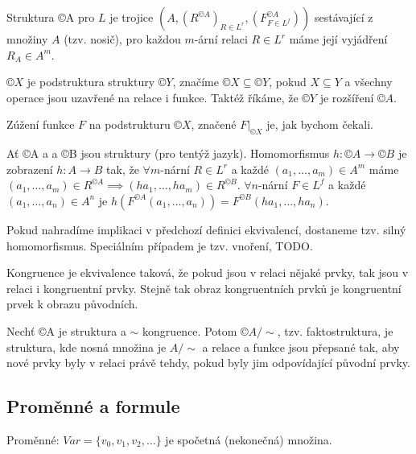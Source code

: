 \documentclass[12pt]{article}                   %
\begin{document}
    \begin{definice}[Struktura]
        Struktura ©A pro $L$ je trojice $(A, (R^{©A})_{R \in L^r}, (F^{©A}_{F \in L^f}))$ sestávající z množiny $A$ (tzv. nosič), pro každou $m$-ární relaci $R \in L^r$ máme její vyjádření $R_A \in A^m$.
    \end{definice}

    \begin{definice}
        $©X$ je podstruktura struktury $©Y$, značíme $©X \subseteq ©Y$, pokud $X \subseteq Y$ a všechny operace jsou uzavřené na relace i funkce. Taktéž říkáme, že $©Y$ je rozšíření $©A$.

        Zúžení funkce $F$ na podstrukturu $©X$, značené $F|_{©X}$ je, jak bychom čekali.
    \end{definice}

    \begin{definice}[Homomorfismus]
        Ať ©A a a ©B jsou struktury (pro tentýž jazyk). Homomorfismus $h: ©A \rightarrow ©B$ je zobrazení $h: A \rightarrow B$ tak, že $\forall m$-nární $R \in L^r$ a každé $(a_1, …, a_m)\in A^m$ máme $(a_1, …, a_m)\in R^{©A} \implies (ha_1, …, ha_m) \in R^{©B}$. $\forall n$-nární $F \in L^f$ a každé $(a_1, …, a_n) \in A^n$ je $h(F^{©A}(a_1, …, a_n)) = F^{©B}(ha_1, …, ha_n)$.
    \end{definice}

    \begin{definice}
        Pokud nahradíme implikaci v předchozí definici ekvivalencí, dostaneme tzv. silný homomorfismus. Speciálním případem je tzv. vnoření, TODO.
    \end{definice}

    \begin{definice}[Kongruence]
        Kongruence je ekvivalence taková, že pokud jsou v relaci nějaké prvky, tak jsou v relaci i kongruentní prvky. Stejně tak obraz kongruentních prvků je kongruentní prvek k obrazu původních.
    \end{definice}

    \begin{definice}
        Nechť ©A je struktura a $\sim$ kongruence. Potom $©A/\sim$, tzv. faktostruktura, je struktura, kde nosná množina je $A/\sim$ a relace a funkce jsou přepsané tak, aby nové prvky byly v relaci právě tehdy, pokud byly jim odpovídající původní prvky.
    \end{definice}

    \subsection{Proměnné a formule}
        \begin{definice}[Proměnné]
            Proměnné: $Var = \{v_0, v_1, v_2, …\}$ je spočetná (nekonečná) množina.
        \end{definice}
\end{document}
